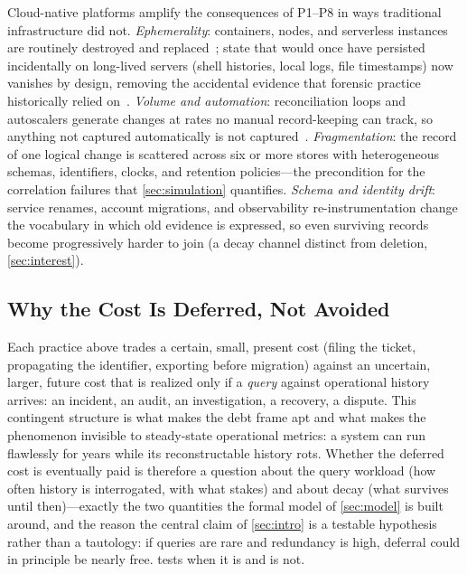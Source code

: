 Cloud-native platforms amplify the consequences of P1--P8 in ways traditional
infrastructure did not. \emph{Ephemerality}: containers, nodes, and serverless
instances are routinely destroyed and replaced~\cite{burns2016}; state that would
once have persisted incidentally on long-lived servers (shell histories, local logs,
file timestamps) now vanishes by design, removing the accidental evidence that
forensic practice historically relied on~\cite{casey2011}. \emph{Volume and
automation}: reconciliation loops and autoscalers generate changes at rates no
manual record-keeping can track, so anything not captured automatically is not
captured~\cite{beetz2022,opengitops}. \emph{Fragmentation}: the record of one
logical change is scattered across six or more stores with heterogeneous schemas,
identifiers, clocks, and retention policies---the precondition for the correlation
failures that \cref{sec:simulation} quantifies. \emph{Schema and identity drift}:
service renames, account migrations, and observability re-instrumentation change the
vocabulary in which old evidence is expressed, so even surviving records become
progressively harder to join (a decay channel distinct from deletion,
\cref{sec:interest}).

\subsection{Why the Cost Is Deferred, Not Avoided}
\label{sec:deferral}

Each practice above trades a certain, small, present cost (filing the ticket,
propagating the identifier, exporting before migration) against an uncertain, larger,
future cost that is realized only if a \emph{query} against operational history
arrives: an incident, an audit, an investigation, a recovery, a dispute. This
contingent structure is what makes the debt frame apt and what makes the phenomenon
invisible to steady-state operational metrics: a system can run flawlessly for years
while its reconstructable history rots. Whether the deferred cost is eventually paid
is therefore a question about the query workload (how often history is interrogated,
with what stakes) and about decay (what survives until then)---exactly the two
quantities the formal model of \cref{sec:model} is built around, and the reason the
central claim of \cref{sec:intro} is a testable hypothesis rather than a tautology:
if queries are rare and redundancy is high, deferral could in principle be nearly
free.  tests when it is and is not.

